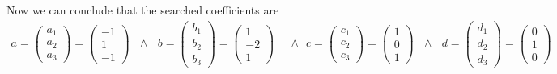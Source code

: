 \documentclass{article}
\begin{document}
        Now we can conclude that the searched coefficients are
        \begin{align}
            a = \left(\begin{matrix} a_1\\a_2\\a_3 \end{matrix}\right) = \left(\begin{matrix} -1\\1\\-1 \end{matrix}\right)
            \ \ \ \wedge\ \ \ 
            b = \left(\begin{matrix} b_1\\b_2\\b_3 \end{matrix}\right) = \left(\begin{matrix} 1\\-2\\1 \end{matrix}\right)
            \ \ \ &\wedge\ \ \ 
            c = \left(\begin{matrix} c_1\\c_2\\c_3 \end{matrix}\right) = \left(\begin{matrix} 1\\0\\1 \end{matrix}\right)
            \ \ \ \wedge\ \ \ 
            d = \left(\begin{matrix} d_1\\d_2\\d_3 \end{matrix}\right) = \left(\begin{matrix} 0\\1\\0 \end{matrix}\right)
        \end{align}
    
    
    
\end{document}
